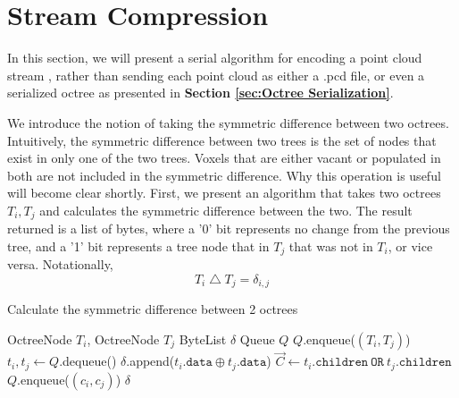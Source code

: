 \documentclass[twoside,twocolumn]{article}
\newcommand{\symdiff}{\ensuremath{\bigtriangleup}}
\begin{document}

\section{Stream Compression} \label{sec:Stream Compression}

In this section, we will present a serial algorithm for encoding a point cloud stream \cite{pcsc},
rather than sending each point cloud as either a .pcd file, or even a serialized octree as presented
in \textbf{Section \ref{sec:Octree Serialization}}.

We introduce the notion of taking the symmetric difference between two octrees. Intuitively, the
symmetric difference between two trees is the set of nodes that exist in only one of the two trees.
Voxels that are either vacant or populated in both are not included in the symmetric difference.
Why this operation is useful will become clear shortly. First, we present an algorithm that takes
two octrees $T_i, T_j$ and calculates the symmetric difference between the two. The result returned
is a list of bytes, where a '0' bit represents no change from the previous tree, and a '1' bit
represents a tree node that in $T_j$ that was not in $T_i$, or vice versa. Notationally,
$$T_i \symdiff T_j = \delta_{i,j}$$


\begin{algorithm}[h]
\small
\caption{Calculate the symmetric difference between 2 octrees}
\label{alg:CalcSymDiff}
\begin{algorithmic}[1]
 {OctreeNode $T_i$, OctreeNode $T_j$}
  \State ByteList $\delta$
  \State Queue $Q$
  \State $Q$.enqueue($(T_i, T_j)$)
    \State $t_i, t_j \gets Q$.dequeue()
      \State $\delta$.append($t_i.\mathtt{data} \oplus t_j.\mathtt{data}$)
      \State $\vec{C} \gets t_i.\mathtt{children} \ \mathtt{OR} \ t_j.\mathtt{children}$
        \State $Q$.enqueue($(c_i, c_j)$)
      \EndFor
    \EndIf
  \EndWhile
  \State \Return $\delta$
\EndProcedure
\Statex
\end{algorithmic}
\vspace{-0.4cm}
\end{algorithm}
\end{document}
